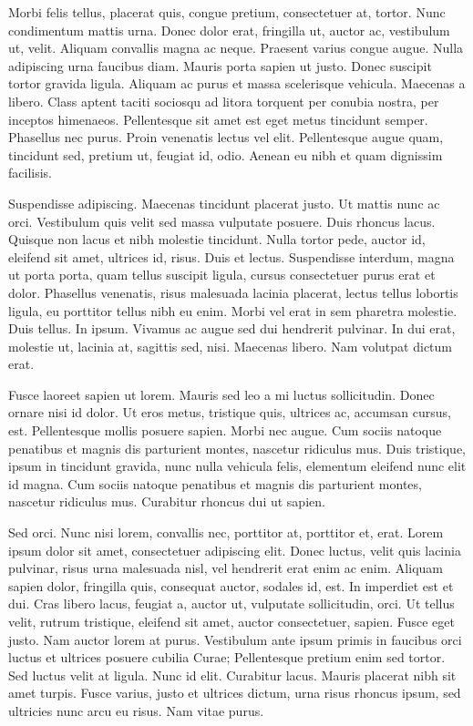 \documentclass[tesis.tex]{subfiles}
\begin{document}
Morbi felis tellus, placerat quis, congue pretium, consectetuer at, tortor.
Nunc condimentum mattis urna. Donec dolor erat, fringilla ut, auctor ac,
vestibulum ut, velit. Aliquam convallis magna ac neque. Praesent varius
congue augue. Nulla adipiscing urna faucibus diam. Mauris porta sapien ut
justo. Donec suscipit tortor gravida ligula. Aliquam ac purus et massa
scelerisque vehicula. Maecenas a libero. Class aptent taciti sociosqu ad
litora torquent per conubia nostra, per inceptos himenaeos. Pellentesque
sit amet est eget metus tincidunt semper. Phasellus nec purus. Proin
venenatis lectus vel elit. Pellentesque augue quam, tincidunt sed, pretium
ut, feugiat id, odio. Aenean eu nibh et quam dignissim facilisis.

Suspendisse adipiscing. Maecenas tincidunt placerat justo. Ut mattis nunc ac
orci. Vestibulum quis velit sed massa vulputate posuere. Duis rhoncus lacus.
Quisque non lacus et nibh molestie tincidunt. Nulla tortor pede, auctor id,
eleifend sit amet, ultrices id, risus. Duis et lectus. Suspendisse interdum,
magna ut porta porta, quam tellus suscipit ligula, cursus consectetuer purus
erat et dolor. Phasellus venenatis, risus malesuada lacinia placerat, lectus
tellus lobortis ligula, eu porttitor tellus nibh eu enim. Morbi vel erat in
sem pharetra molestie. Duis tellus. In ipsum. Vivamus ac augue sed dui
hendrerit pulvinar. In dui erat, molestie ut, lacinia at, sagittis sed, nisi.
Maecenas libero. Nam volutpat dictum erat.

Fusce laoreet sapien ut lorem. Mauris sed leo a mi luctus sollicitudin.
Donec ornare nisi id dolor. Ut eros metus, tristique quis, ultrices ac,
accumsan cursus, est. Pellentesque mollis posuere sapien. Morbi nec augue.
Cum sociis natoque penatibus et magnis dis parturient montes, nascetur
ridiculus mus. Duis tristique, ipsum in tincidunt gravida, nunc nulla
vehicula felis, elementum eleifend nunc elit id magna. Cum sociis natoque
penatibus et magnis dis parturient montes, nascetur ridiculus mus. Curabitur
rhoncus dui ut sapien.

Sed orci. Nunc nisi lorem, convallis nec, porttitor at, porttitor et, erat.
Lorem ipsum dolor sit amet, consectetuer adipiscing elit. Donec luctus, velit
quis lacinia pulvinar, risus urna malesuada nisl, vel hendrerit erat enim ac
enim. Aliquam sapien dolor, fringilla quis, consequat auctor, sodales id,
est. In imperdiet est et dui. Cras libero lacus, feugiat a, auctor ut,
vulputate sollicitudin, orci. Ut tellus velit, rutrum tristique, eleifend sit
amet, auctor consectetuer, sapien. Fusce eget justo. Nam auctor lorem at
purus. Vestibulum ante ipsum primis in faucibus orci luctus et ultrices
posuere cubilia Curae; Pellentesque pretium enim sed tortor. Sed luctus velit
at ligula. Nunc id elit. Curabitur lacus. Mauris placerat nibh sit amet
turpis. Fusce varius, justo et ultrices dictum, urna risus rhoncus ipsum, sed
ultricies nunc arcu eu risus. Nam vitae purus.
\end{document}
